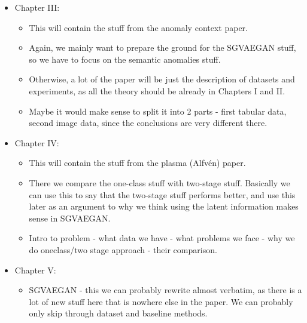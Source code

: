 \documentclass[twoside, a4paper, 12pt]{book}
\begin{document}
\begin{itemize}
	\item Chapter III: 
		\begin{itemize}
			\item This will contain the stuff from the anomaly context paper.
			\item Again, we mainly want to prepare the ground for the SGVAEGAN stuff, so we have to focus on the semantic anomalies stuff.
			\item Otherwise, a lot of the paper will be just the description of datasets and experiments, as all the theory should be already in Chapters I and II.
			\item Maybe it would make sense to split it into 2 parts - first tabular data, second image data, since the conclusions are very different there.
		\end{itemize}
	\item Chapter IV: 
		\begin{itemize}
			\item This will contain the stuff from the plasma (Alfvén) paper.
			\item There we compare the one-class stuff with two-stage stuff. Basically we can use this to say that the two-stage stuff performs better, and use this later as an argument to why we think using the latent information makes sense in SGVAEGAN.
			\item Intro to problem - what data we have - what problems we face - why we do oneclass/two stage approach - their comparison.
		\end{itemize}
	\item Chapter V: 
		\begin{itemize}
			\item SGVAEGAN - this we can probably rewrite almost verbatim, as there is a lot of new stuff here that is nowhere else in the paper. We can probably only skip through dataset and baseline methods.
		\end{itemize}

\end{itemize}

\begin{theorem}
    \lipsum[5]
\end{theorem}

\begin{example}
    \lipsum[5]
\end{example}





\end{document}
